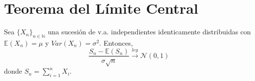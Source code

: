 \section{Teorema del Límite Central}

\begin{theo}
Sea $\{ X_n\}_{n\in\mathbb{N}}$ una sucesión de v.a. independientes identicamente distribuidas con $\mathbb{E}(X_n)=\mu$ y $Var(X_n) = \sigma^2$. Entonces, \[ \frac{S_n-\mathbb{E}(S_n)}{\sigma\sqrt{n}}\xrightarrow{ley}\mathcal{N}(0,1) \] donde $S_n = \sum_{i=1}^n X_i$.
\end{theo}


